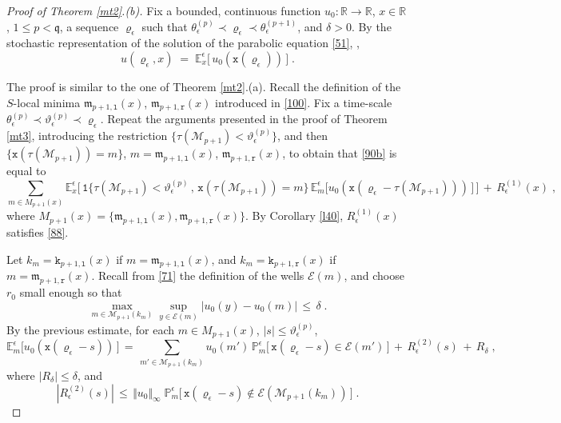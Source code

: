 \documentclass[reqno]{amsart}
\theoremstyle{plain}
\theoremstyle{definition}
\newcommand{\mf}[1]{{\mathfrak #1}}
\newcommand{\bb}[1]{{\mathbb #1}}
\newcommand{\ms}[1]{{\mathscr #1}}
\newcommand{\mtt}[1]{{\mathtt #1}}
\newcounter{as}[section]
\newcommand{\<}{\langle}
\renewcommand{\>}{\rangle}
\begin{document}
\begin{proof}[Proof of Theorem \ref{mt2}.{\rm (b)}]
Fix a bounded, continuous function $u_0\colon \bb R \to \bb R$,
$x\in\bb R$, $1\le p< \mf q$, a sequence $\varrho_\epsilon$
such that
$\theta^{(p)}_\epsilon \prec \varrho_\epsilon \prec
\theta^{(p+1)}_\epsilon$, and $\delta>0$.
By the stochastic representation of the solution of the parabolic
equation \eqref{51}, \cite[Theorem 6.5.3]{Fri},
\begin{equation}
\label{90b}
u(\varrho_\epsilon,x) \;=\;
\bb E^{\epsilon}_x\big[ \,
u_0( \mtt x(\varrho_\epsilon))\,\big] \;.
\end{equation}

The proof is similar to the one of Theorem \ref{mt2}.(a).  Recall
the definition of the $S$-local minima $\mf m_{p+1,\mtt l}(x)$,
$\mf m_{p+1,\mtt r}(x)$ introduced in \eqref{100}.  Fix a time-scale
$\theta^{(p)}_\epsilon\prec \vartheta^{(p)}_\epsilon \prec
\varrho_\epsilon$.  Repeat the arguments presented in the proof of
Theorem \ref{mt3}, introducing the restriction
$\{\tau(\ms M_{p+1}) < \vartheta^{(p)}_\epsilon\}$, and then
$\{\mtt x(\tau(\ms M_{p+1})) = m \}$, $m = \mf m_{p+1,\mtt l}(x)$,
$\mf m_{p+1,\mtt r}(x)$, to obtain that \eqref{90b} is equal to
\begin{equation}
\label{91b}
\sum_{m\in M_{p+1}(x)} \bb E^{\epsilon}_{x}
\Big[ \, \mtt 1\big\{ \tau(\ms M_{p+1}) <
\vartheta^{(p)}_\epsilon\,,\,
\mtt x(\tau(\ms M_{p+1})) = m \big\}\,
\bb E^{\epsilon}_{m} \big[ u_0( \mtt x(\varrho_\epsilon -
\tau(\ms M_{p+1}))) \,\big] \,\Big] \,+\, R^{(1)}_\epsilon (x)\;,
\end{equation}
where
$M_{p+1}(x) = \{\mf m_{p+1,\mtt l}(x) , \mf m_{p+1,\mtt r}(x)\}$. By
Corollary \ref{l40}, $R^{(1)}_\epsilon (x)$ satisfies \eqref{88}.

Let $k_m = \mtt k_{p+1,\mtt l}(x)$ if $m= \mf m_{p+1,\mtt l}(x)$, and
$k_m = \mtt k_{p+1,\mtt r}(x)$ if $m= \mf m_{p+1,\mtt r}(x)$.  Recall
from \eqref{71} the definition of the wells $\ms E(m)$, and choose
$r_0$ small enough so that
\begin{equation*}
\max_{m\in \ms M_{p+1}(k_m) } \sup_{y\in\ms E(m)} |u_0(y) -
u_0(m)| \,\le\, \delta \;.
\end{equation*}
By the previous estimate, for each $m\in M_{p+1}(x)$, $|s| \le
\vartheta^{(p)}_\epsilon$, 
\begin{equation}
\label{87}
\bb E^{\epsilon}_{m} \big[ u_0( \mtt x(\varrho_\epsilon - s))
\,\big] 
\,=\, \sum_{m'\in \ms M_{p+1}(k_m)} u_0(m')\, 
\bb P^{\epsilon}_m\big[ \, 
\mtt x(\varrho_\epsilon - s) \in \ms E(m') \, \big]
\,+\, R^{(2)}_\epsilon (s)\,+\, R_\delta \;,
\end{equation}
where $|R_\delta| \le \delta$, and 
\begin{equation*}
|R^{(2)}_\epsilon (s)| \,\le\, \Vert u_0\Vert_\infty\;
\bb P^{\epsilon}_m\Big[ \, 
\mtt x(\varrho_\epsilon - s) \not\in \ms E(\ms M_{p+1}(k_m)) \,\Big] \;.
\end{equation*}


\end{proof}
\end{document}
